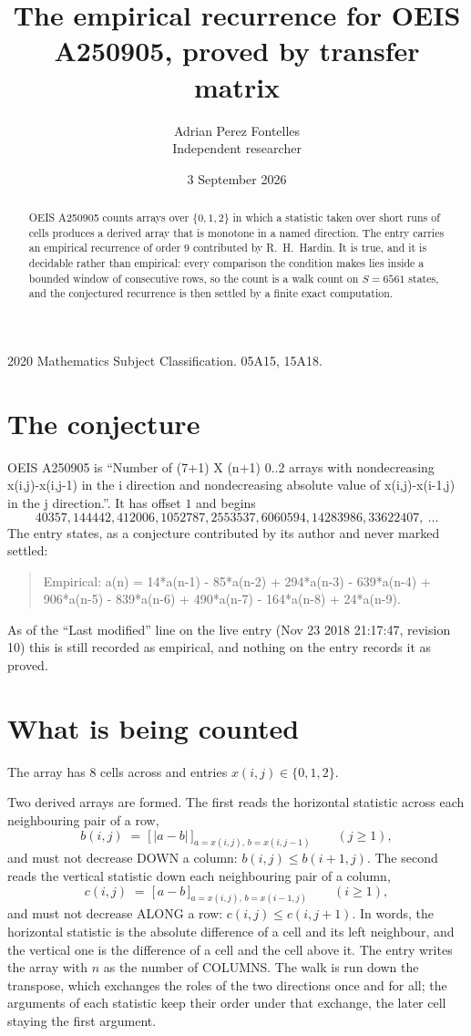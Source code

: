 \documentclass[11pt,a4paper]{article}
\title{The empirical recurrence for OEIS A250905, proved by transfer matrix}
\author{Adrian Perez Fontelles\\ \small Independent researcher}
\date{3 September 2026}
\theoremstyle{plain}
\theoremstyle{definition}
\begin{document}
\maketitle

\begin{abstract}
OEIS A250905 counts arrays over $\{0,1,2\}$ in which a statistic taken over short runs
of cells produces a derived array that is monotone in a named direction. The entry carries an
empirical recurrence of order $9$ contributed by R.~H.~Hardin. It is true, and it is
decidable rather than empirical: every comparison the condition makes lies inside a bounded
window of consecutive rows, so the count is a walk count on $S=6561$ states, and the
conjectured recurrence is then settled by a finite exact computation.
\end{abstract}

\noindent\small 2020 Mathematics Subject Classification. 05A15, 15A18.\normalsize

\section{The conjecture}

OEIS A250905 is ``Number of (7+1) X (n+1) 0..2 arrays with nondecreasing x(i,j)-x(i,j-1) in the i direction and nondecreasing absolute value of x(i,j)-x(i-1,j) in the j direction.''. It has offset $1$ and begins
\[
40357, 144442, 412006, 1052787, 2553537, 6060594, 14283986, 33622407,\ \dots
\]
The entry states, as a conjecture contributed by its author and never marked settled:
\begin{quote}
Empirical: a(n) = 14*a(n-1) - 85*a(n-2) + 294*a(n-3) - 639*a(n-4) + 906*a(n-5) - 839*a(n-6) + 490*a(n-7) - 164*a(n-8) + 24*a(n-9).
\end{quote}
As of the ``Last modified'' line on the live entry (Nov 23 2018 21:17:47, revision 10) this is still
recorded as empirical, and nothing on the entry records it as proved.

\section{What is being counted}

The array has $8$ cells across and entries $x(i,j)\in\{0,1,2\}$.

Two derived arrays are formed. The first reads the horizontal statistic across each
neighbouring pair of a row,
\[
b(i,j)\;=\;\bigl[\,\lvert a-b\rvert\,\bigr]_{a=x(i,j),\,b=x(i,j-1)}\qquad (j\ge1),
\]
and must not decrease DOWN a column: $b(i,j)\le b(i{+}1,j)$. The second reads the vertical
statistic down each neighbouring pair of a column,
\[
c(i,j)\;=\;\bigl[\,a-b\,\bigr]_{a=x(i,j),\,b=x(i{-}1,j)}\qquad (i\ge1),
\]
and must not decrease ALONG a row: $c(i,j)\le c(i,j{+}1)$. In words, the horizontal statistic
is the absolute difference of a cell and its left neighbour, and the vertical one is
the difference of a cell and the cell above it. The entry writes the array with $n$ as the number of COLUMNS. The walk is run down the transpose, which exchanges the roles of the two directions once and for all; the arguments of each statistic keep their order under that exchange, the later cell staying the first argument.
\end{document}
